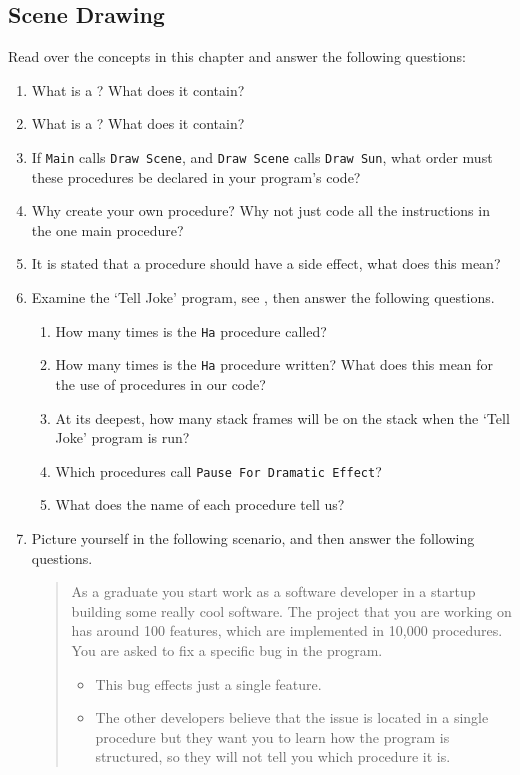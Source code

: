 \subsection{Scene Drawing} %
\label{sub:scene_drawing}

Read over the concepts in this chapter and answer the following questions:
\begin{enumerate}
  \item What is a ? What does it contain?
  \item What is a ? What does it contain?
  \item If \texttt{Main} calls \texttt{Draw Scene}, and \texttt{Draw Scene} calls \texttt{Draw Sun}, what order must these procedures be declared in your program's code?
  \item Why create your own procedure? Why not just code all the instructions in the one main procedure?
  \item It is stated that a procedure should have a side effect, what does this mean?
  \item Examine the `Tell Joke' program, see , then answer the following questions.
  \begin{enumerate}
    \item How many times is the \texttt{Ha} procedure called?
    \item How many times is the \texttt{Ha} procedure written? What does this mean for the use of procedures in our code?
    \item At its deepest, how many stack frames will be on the stack when the `Tell Joke' program is run?
    \item Which procedures call \texttt{Pause For Dramatic Effect}?
    \item What does the name of each procedure tell us?
  \end{enumerate}
  \item Picture yourself in the following scenario, and then answer the following questions.
  \begin{quote}
    As a graduate you start work as a software developer in a startup building some really cool software. The project that you are working on has around 100 features, which are implemented in 10,000 procedures. You are asked to fix a specific bug in the program. 
    \begin{itemize}
      \item This bug effects just a single feature. 
      \item The other developers believe that the issue is located in a single procedure but they want you to learn how the program is structured, so they will not tell you which procedure it is. 

\end{itemize}
\end{quote}
\end{enumerate}
